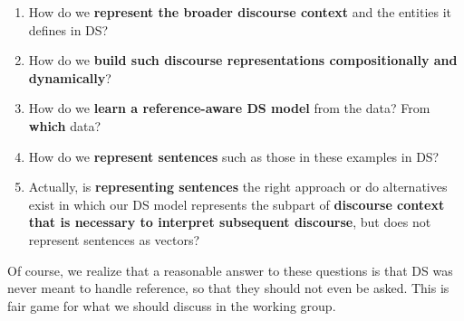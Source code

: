\documentclass[a4paper,12pt]{article}
\begin{document}
\begin{enumerate}
\item How do we \textbf{represent the broader discourse context} and
  the entities it defines in DS?
\item How do we \textbf{build such discourse representations
  compositionally and dynamically}?
\item How do we \textbf{learn a reference-aware DS model} from the
  data? From \textbf{which} data?
\item How do we \textbf{represent sentences} such as those in these
  examples in DS?
\item Actually, is \textbf{representing sentences} the right
  approach or do alternatives exist in which 
our DS model represents
  the subpart of \textbf{discourse context that is necessary to
  interpret subsequent discourse}, but does not represent
  sentences as vectors?
\end{enumerate}

Of course, we realize that a reasonable answer to these questions is
that DS was never meant to handle reference, so that they should not
even be asked. This is fair game for what we should discuss in the
working group.


%
%
%
%
%
%
%
%
%
%
%
\end{document}
